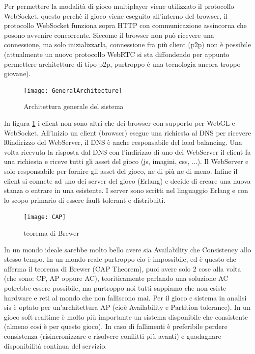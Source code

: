 \documentclass[paper=a4, fontsize=11pt]{scrartcl} %
\numberwithin{equation}{section} %
\numberwithin{figure}{section} %
\numberwithin{table}{section} %
\begin{document}
Per permettere la modalità di gioco multiplayer viene utilizzato il protocollo WebSocket,
questo perchè il gioco viene eseguito all'interno del browser, il protocollo WebSocket
funziona sopra HTTP con communicazione assincorna che posono avvenire concorrente.
Siccome il browser non può ricevere una connessione, ma solo inizializzarla, connessione
fra più client (p2p) non è possibile (attualmente un nuovo protocollo WebRTC si sta
diffondendo per appunto permettere architetture di tipo p2p, purtroppo è una tecnologia ancora troppo giovane).

\begin{figure}
\centering
\texttt{[image: GeneralArchitecture]}
\caption{Architettura generale del sistema}
\label{GenArc}
\end{figure}

In figura \ref{GenArc} i client non sono altri che dei browser con supporto per WebGL e WebSocket. All'inizio un client (browser) esegue una richiesta al DNS per ricevere l0indirizzo del WebServer, il DNS è anche responsabile del load balancing. Una volta ricevuta la risposta dal DNS con l'indirizzo di uno dei WebServer il client fa una richiesta e riceve tutti gli asset del gioco (js, imagini, css, ...). Il WebServer e solo responsabile per fornire gli asset del gioco, ne di più ne di meno. Infine il client si connete ad uno dei server del gioco (Erlang) e decide di creare una nuova stanza o entrare in una esistente. I server sono scritti nel linguaggio Erlang e con lo scopo primario di essere fault tolerant e distribuiti.

\begin{figure}[h]
\centering
\texttt{[image: CAP]}
\caption{teorema di Brewer}
\label{CAP}
\end{figure}

In un mondo ideale sarebbe molto bello avere sia Availability che Consistency allo stesso tempo.
In un mondo reale purtroppo cio è impossibile, ed è questo che afferma il teorema di Brewer (CAP Theorem), puoi avere solo 2 cose alla volta (che sono: CP, AP oppure AC), teoriticamente parlando una soluzione AC potrebbe essere possibile, ma purtroppo noi tutti sappiamo che non esiste hardware e reti al mondo che non falliscono mai.
Per il gioco e sistema in analisi sis è optato per un'architettura AP (cioè Availability e Partition tolerance). In un gioco soft realtime è molto più importante un sistema disponibile che consistente (almeno cosi è per questo gioco). In caso di fallimenti è preferibile perdere consistenza (risincronizzare e risolvere conflitti più avanti) e guadagnare disponibilità continua del servizio.
\end{document}
